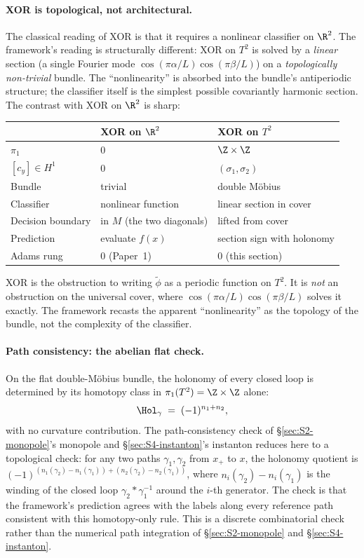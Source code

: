 \paragraph{XOR is topological, not architectural.} The classical
reading of XOR is that it requires a nonlinear classifier on
$\R^2$. The framework's reading is structurally different: XOR on
$T^2$ is solved by a \emph{linear} section (a single Fourier mode
$\cos(\pi\alpha/L)\cos(\pi\beta/L)$) on a \emph{topologically
non-trivial} bundle. The ``nonlinearity'' is absorbed into the
bundle's antiperiodic structure; the classifier itself is the
simplest possible covariantly harmonic section. The contrast with
XOR on $\R^2$ is sharp:

\begin{center}
\renewcommand{\arraystretch}{1.2}
\begin{tabular}{lll}
\toprule
& \textbf{XOR on $\R^2$} & \textbf{XOR on $T^2$} \\
\midrule
$\pi_1$ & $0$ & $\Z\times\Z$ \\
$[c_y]\in H^1$ & $0$ & $(\sigma_1,\sigma_2)$ \\
Bundle & trivial & double M\"obius \\
Classifier & nonlinear function & linear section in cover \\
Decision boundary & in $M$ (the two diagonals) & lifted from cover \\
Prediction & evaluate $f(x)$ & section sign with holonomy \\
Adams rung & 0 (Paper~1) & 0 (this section) \\
\bottomrule
\end{tabular}
\end{center}

XOR is the obstruction to writing $\tilde\phi$ as a periodic
function on $T^2$. It is \emph{not} an obstruction on the universal
cover, where $\cos(\pi\alpha/L)\cos(\pi\beta/L)$ solves it
exactly. The framework recasts the apparent ``nonlinearity'' as the
topology of the bundle, not the complexity of the classifier.

\paragraph{Path consistency: the abelian flat check.} On the flat
double-M\"obius bundle, the holonomy of every closed loop is
determined by its homotopy class in $\pi_1(T^2)=\Z\times\Z$ alone:
\[
   \Hol_\gamma \;=\; (-1)^{n_1+n_2},
\]
with no curvature contribution. The path-consistency check of
\S\ref{sec:S2-monopole}'s monopole and \S\ref{sec:S4-instanton}'s
instanton reduces here to a topological check: for any two paths
$\gamma_1,\gamma_2$ from $x_+$ to $x$, the holonomy quotient is
$(-1)^{(n_1(\gamma_2)-n_1(\gamma_1))+(n_2(\gamma_2)-n_2(\gamma_1))}$,
where $n_i(\gamma_2)-n_i(\gamma_1)$ is the winding of the closed
loop $\gamma_2*\gamma_1^{-1}$ around the $i$-th generator. The check
is that the framework's prediction agrees with the labels along
every reference path consistent with this homotopy-only rule. This
is a discrete combinatorial check rather than the numerical path
integration of \S\ref{sec:S2-monopole} and \S\ref{sec:S4-instanton}.

